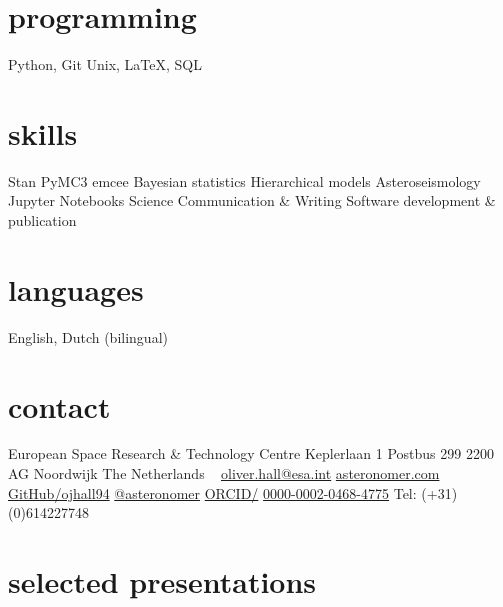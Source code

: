 \documentclass[letterpaper]{k-cv} %
\begin{document}


\begin{aside} %
\section{\color{c1}programming}
\bodyfont Python, Git
Unix, LaTeX,
SQL
\section{\color{c2}skills}
Stan
PyMC3
emcee 
Bayesian statistics
Hierarchical models
Asteroseismology
Jupyter Notebooks
Science Communication \& Writing
Software development \& publication
\section{\color{c3}languages}
English, Dutch (bilingual)
\section{\color{c4}contact}
European Space Research \& Technology Centre
Keplerlaan 1
Postbus 299
2200 AG Noordwijk
The Netherlands
~
\href{mailto:oliver.hall@esa.int}{oliver.hall@esa.int}
\href{www.asteronomer.com}{asteronomer.com}
\href{http://www.github.com/ojhall94}{GitHub/ojhall94}
\href{http://www.twitter.com/asteronomer}{@asteronomer}
\href{http://www.orcid.com/0000-0002-0468-4775}{ORCID/}
\href{http://www.orcid.com/0000-0002-0468-4775}{0000-0002-0468-4775}
Tel: (+31)(0)614227748
\end{aside}

\section{\color{c1}selected presentations}
\end{document}
